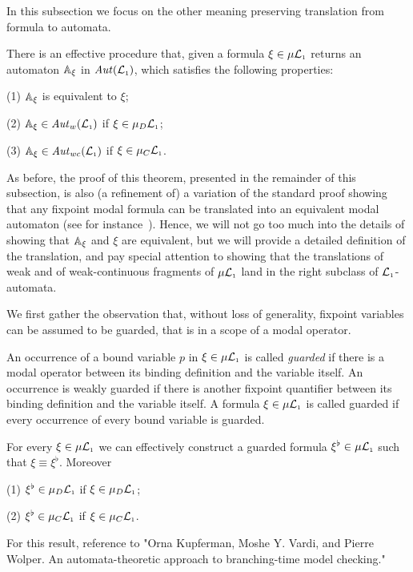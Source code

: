 
In this subsection we focus on the other meaning preserving translation from formula to automata.

\begin{theorem}\label{t:fortoaut}
There is an effective procedure that, given a formula $\xi  \in \mu\mathcal{L}_{\scriptscriptstyle 1}$ returns an automaton $\mathbb{A}_{\xi}$ in 
$\mathit{Aut}(\mathcal{L}_{\scriptscriptstyle 1})$, which satisfies
the following properties:

(1) $\mathbb{A}_\xi$ is equivalent to $\xi$;

(2)  $\mathbb{A}_\xi \in \mathit{Aut}_{w}(\mathcal{L}_{\scriptscriptstyle 1})$ if $\xi \in \mu_{D}\mathcal{L}_{\scriptscriptstyle 1}$;

(3)  $\mathbb{A}_\xi \in \mathit{Aut}_{wc}(\mathcal{L}_{\scriptscriptstyle 1})$ if $\xi \in \mu_{C}\mathcal{L}_{\scriptscriptstyle 1}$.
\end{theorem}


As before, the proof of this theorem, presented in the remainder of this subsection, is  also (a refinement of)
a variation of the standard proof showing that any fixpoint modal formula can be 
translated into an equivalent modal automaton (see for
instance~\cite[Section 6]{Ven08}). 
Hence, we will not go too much into the details of showing that ${\mathbb{A}}_\xi$ and 
$\xi$ are equivalent, but we will provide a detailed definition of the 
translation, and pay special attention to showing that the translations of weak
and of weak-continuous fragments of 
$\mu\mathcal{L}_{\scriptscriptstyle 1}$ land in the right subclass of  $\mathcal{L}_{\scriptscriptstyle 1}$-automata.

We first gather the observation that, without loss of generality, fixpoint variables can be assumed to be guarded, that is in a scope of a modal operator.
 
\begin{definition}
An occurrence of a bound variable $p$ in $\xi  \in \mu\mathcal{L}_{\scriptscriptstyle 1}$ is called \emph{guarded} if there is a modal operator between its binding definition and the variable itself. An occurrence is weakly guarded if there is another fixpoint quantifier between its binding definition and the variable itself. A formula $\xi  \in \mu\mathcal{L}_{\scriptscriptstyle 1}$ is called guarded if every occurrence of every bound variable is guarded.
\end{definition}

\begin{proposition}
For every $\xi  \in \mu\mathcal{L}_{\scriptscriptstyle 1}$ we can effectively construct a guarded formula $\xi^\flat  \in \mu\mathcal{L}_{\scriptscriptstyle 1}$ such that $\xi \equiv \xi^\flat$. Moreover

(1)  $\xi^\flat \in \mu_{D}\mathcal{L}_{\scriptscriptstyle 1}$ if $\xi \in \mu_{D}\mathcal{L}_{\scriptscriptstyle 1}$;

(2)  $\xi^\flat \in \mu_{C}\mathcal{L}_{\scriptscriptstyle 1}$ if $\xi \in \mu_{C}\mathcal{L}_{\scriptscriptstyle 1}$.
\end{proposition}
\btbs
\item
For this result, reference to "Orna Kupferman, Moshe Y. Vardi, and Pierre Wolper. An automata-theoretic approach to branching-time model checking."
\etbs

